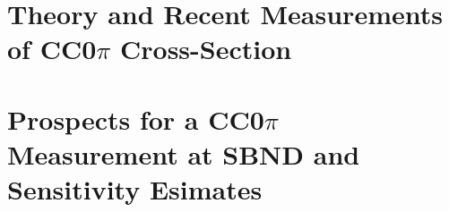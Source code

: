 \documentclass[11pt]{article}
\begin{document}


\section{Theory and Recent Measurements of CC0\( \pi \) Cross-Section}
\label{sec:XSec}



\section{Prospects for a CC0\( \pi \) Measurement at SBND and Sensitivity Esimates}
\label{sec:Prospects}



%

%

\newpage





\end{document}
